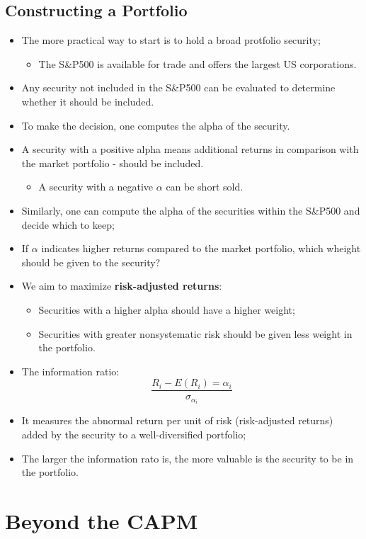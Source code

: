\documentclass[11pt,a4paper]{report}
\begin{document}
\subsection{Constructing a Portfolio}
\begin{itemize}
    \item The more practical way to start is to hold a broad protfolio security;
    \begin{itemize}
        \item The S\&P500 is available for trade and offers the largest US corporations.
    \end{itemize}
    \item Any security not included in the S\&P500 can be evaluated to determine whether it should be included.
    \item To make the decision, one computes the alpha of the security.
    \item A security with a positive alpha means additional returns in comparison with the market portfolio - should be included.
    \begin{itemize}
        \item A security with a negative $\alpha$ can be short sold.
    \end{itemize}
    \item Similarly, one can compute the alpha of the securities within the S\&P500 and decide which to keep;
    \item If $\alpha$ indicates higher returns compared to the market portfolio, which wheight should be given to the security?
    \item We aim to maximize \textbf{risk-adjusted returns}:
    \begin{itemize}
        \item Securities with a higher alpha should have a higher weight;
        \item Securities with greater nonsystematic risk should be given less weight in the portfolio.
    \end{itemize}
    \item The information ratio:
    \[\frac{R_i - E(R_i) = \alpha_i}{\sigma_{\alpha_i}}\]
    \item It measures the abnormal return per unit of risk (risk-adjusted returns) added by the security to a well-diversified portfolio;
    \item The larger the information rato is, the more valuable is the security to be in the portfolio.
\end{itemize}
\section{Beyond the CAPM}
\end{document}
